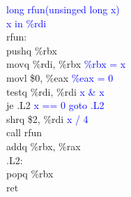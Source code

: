 \documentclass{article}
\newcommand{\blue}[1]{\textcolor{blue}{#1}}
\begin{document}
\begin{CJK}{UTF8}{gbsn}
\blue{long rfun(unsinged long x)}	\\
\blue{x in \%rdi}	\\
rfun:	\\
	\hspace*{1em}pushq \%rbx	\\
	\hspace*{1em}movq \%rdi, \%rbx	\blue{\%rbx = x}\\
	\hspace*{1em}movl \$0, \%eax	\blue{\%eax = 0}\\
	\hspace*{1em}testq \%rdi, \%rdi	\blue{x \& x}\\
	\hspace*{1em}je .L2	\blue{x ==  0 goto .L2}\\
	\hspace*{1em}shrq \$2, \%rdi	\blue{x / 4}\\
	\hspace*{1em}call rfun	\\
	\hspace*{1em}addq \%rbx, \%rax	\\
.L2:	\\
	\hspace*{1em}popq \%rbx	\\
	\hspace*{1em}ret	\\
\end{CJK}
\end{document}
